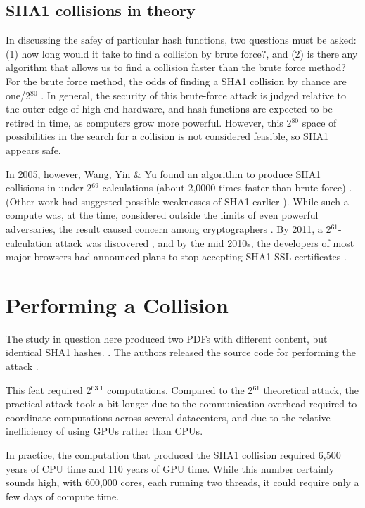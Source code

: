 \documentclass[sigconf]{acmart}
\begin{document}
\subsection{SHA1 collisions in theory}
\label{sec:org2c6f7c5}

In discussing the safey of particular hash functions, two questions must be asked:
(1) how long would it take to find a collision by brute force?, and 
(2) is there any algorithm that allows us to find a collision faster than the brute force method?
For the brute force method, the odds of finding a SHA1 collision by chance are one/2\(^{\text{80}}\)
\cite{Schneier2005}.
In general, the security of this brute-force attack is judged relative to the outer edge of high-end hardware, and hash functions are expected to be retired in time, as computers grow more powerful.
However, this 2\(^{\text{80}}\) space of possibilities in the search for a collision is not considered feasible, so SHA1 appears safe.

In 2005, however, Wang, Yin \& Yu found an algorithm to produce SHA1 collisions in under 2\(^{\text{69}}\) calculations (about 2,0000 times faster than brute force)
\cite{Wang2005}.
(Other work had suggested possible weaknesses of SHA1 earlier \cite{Biham2005}).
While such a compute was, at the time, considered outside the limits of even powerful adversaries,
the result caused concern among cryptographers \cite{Schneier2005}.
By 2011, a 2\(^{\text{61}}\)-calculation attack was discovered \cite{Stevens2013a},
and by the mid 2010s, the developers of most major browsers had announced plans to stop accepting SHA1 SSL certificates 
\cite{Mozilla2017,Sleevi2014}.

\section{Performing a Collision}
\label{sec:org307f820}

The study in question here produced two PDFs with different content, but identical SHA1 hashes.
\cite{Stevens2017}.
The authors released the source code for performing the attack
\cite{Stevens2017github}.

This feat required 2\(^{\text{63.1}}\) computations. 
Compared to the 2\(^{\text{61}}\) theoretical attack, the practical attack took a bit longer due to the communication overhead required to coordinate computations across several datacenters, and due to the relative inefficiency of using GPUs rather than CPUs.

In practice, the computation that produced the SHA1 collision required 6,500 years of CPU time and 110 years of GPU time. While this number certainly sounds high, with 600,000 cores, each running two threads, it could require only a few days of compute time.
\end{document}
